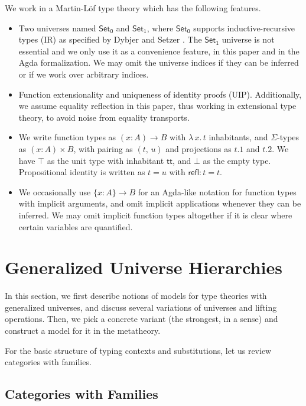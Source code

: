 \documentclass[a4paper,UKenglish,cleveref, autoref, thm-restate]{lipics-v2021}
\theoremstyle{remark}
\theoremstyle{definition}
\newcommand{\Set}[1]{\mathsf{Set_{#1}}}
\newcommand{\refl}{\mathsf{refl}}
\renewcommand{\tt}{\mathsf{tt}}
\begin{document}
We work in a Martin-Löf type theory which has the following features.
\begin{itemize}
  \item Two universes named $\Set0$ and $\Set1$, where $\Set0$ supports
    inductive-recursive types (IR) as specified by Dybjer and Setzer
    \cite{dybjer99finite}. The $\Set1$ universe is not essential and we only use
    it as a convenience feature, in this paper and in the Agda formalization. We
    may omit the universe indices if they can be inferred or if we work over
    arbitrary indices.
  \item Function extensionality and uniqueness of identity proofs
    (UIP). Additionally, we assume equality reflection in this paper, thus
    working in extensional type theory, to avoid noise from equality transports.
  \item We write function types as $(x : A)\to B$ with $\lambda\,x.\,t$
    inhabitants, and $\Sigma$-types as $(x : A) \times B$, with pairing as
    $(t,\, u)$ and projections as $t.1$ and $t.2$. We have $\top$ as the unit
    type with inhabitant $\tt$, and $\bot$ as the empty type. Propositional identity
    is written as $t = u$ with $\refl : t = t$.
  \item We occasionally use $\{x : A\} \to B$ for an Agda-like notation for
    function types with implicit arguments, and omit implicit applications
    whenever they can be inferred. We may omit implicit function types
    altogether if it is clear where certain variables are quantified.
\end{itemize}

\section{Generalized Universe Hierarchies}
\label{sec:ttgu}

In this section, we first describe notions of models for type theories with
generalized universes, and discuss several variations of universes and lifting
operations. Then, we pick a concrete variant (the strongest, in a sense)
and construct a model for it in the metatheory.

For the basic structure of typing contexts and substitutions, let us review
categories with families.

\subsection{Categories with Families}
\label{sec:categories_with_families}
\end{document}
